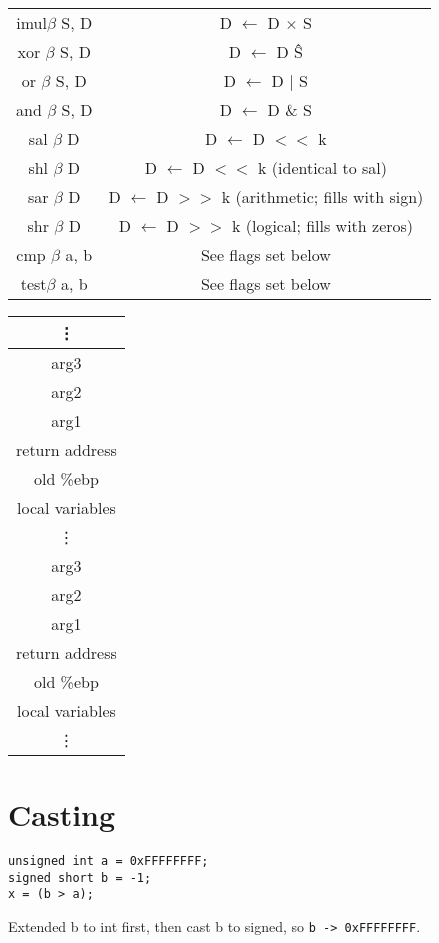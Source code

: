 \documentclass[11pt]{article}
\begin{document}
\begin{tabular}{|c|c|}
imul$\beta$       S, D & D $\leftarrow$ D $\times$ S                                        \\
xor $\beta$       S, D & D $\leftarrow$ D \^ S                                              \\
or  $\beta$       S, D & D $\leftarrow$ D | S                                               \\
and $\beta$       S, D & D $\leftarrow$ D \& S                                              \\
\hline
sal $\beta$          D & D $\leftarrow$ D $<<$ k                                            \\
shl $\beta$          D & D $\leftarrow$ D $<<$ k (identical to sal)                         \\
sar $\beta$          D & D $\leftarrow$ D $>>$ k (arithmetic; fills with sign)              \\
shr $\beta$          D & D $\leftarrow$ D $>>$ k (logical; fills with zeros)                \\
\hline
cmp $\beta$       a, b & See flags set below                                                \\
test$\beta$       a, b & See flags set below                                                \\
\hline
\end{tabular}
\begin{tabular}{|c|}
\vdots          \\
\hline
arg3            \\
\hline
arg2            \\
\hline
arg1            \\
\hline
return address  \\
\hline
old \%ebp       \\
\hline
local variables \\
\hline
\vdots          \\
\hline
arg3            \\
\hline
arg2            \\
\hline
arg1            \\
\hline
return address  \\
\hline
old \%ebp       \\
\hline
local variables \\
\hline
\vdots          \\
\end{tabular}
\section{Casting}
\begin{verbatim}
unsigned int a = 0xFFFFFFFF;
signed short b = -1;
x = (b > a);
\end{verbatim}
Extended b to int first, then cast b to signed, so
\texttt{b -> 0xFFFFFFFF}.
\end{document}

